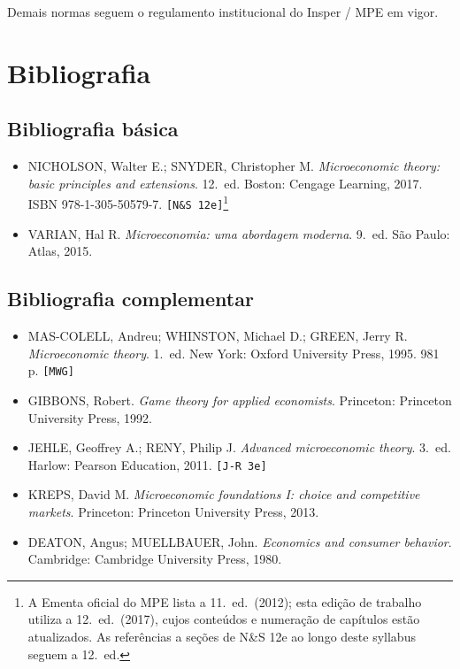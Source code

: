 \documentclass[11pt,a4paper]{article}
\newcommand{\ns}{N\&S 12e}
\newcommand{\jr}{J-R 3e}
\newcommand{\mwg}{MWG}
\begin{document}
Demais normas seguem o regulamento institucional do Insper / MPE em vigor.

\section{Bibliografia}
\label{sec:bibliografia}

\subsection*{Bibliografia básica}

\begin{itemize}
  \item NICHOLSON, Walter E.; SNYDER, Christopher M. \textit{Microeconomic theory: basic principles and extensions}. 12.~ed. Boston: Cengage Learning, 2017. ISBN 978-1-305-50579-7. \texttt{[\ns{}]}\footnote{A Ementa oficial do MPE lista a 11.~ed.\ (2012); esta edição de trabalho utiliza a 12.~ed.\ (2017), cujos conteúdos e numeração de capítulos estão atualizados. As referências a seções de \ns{} ao longo deste syllabus seguem a 12.~ed.}
  \item VARIAN, Hal R. \textit{Microeconomia: uma abordagem moderna}. 9.~ed. São Paulo: Atlas, 2015.
\end{itemize}

\subsection*{Bibliografia complementar}

\begin{itemize}
  \item MAS-COLELL, Andreu; WHINSTON, Michael D.; GREEN, Jerry R. \textit{Microeconomic theory}. 1.~ed. New York: Oxford University Press, 1995. 981 p. \texttt{[\mwg{}]}
  \item GIBBONS, Robert. \textit{Game theory for applied economists}. Princeton: Princeton University Press, 1992.
  \item JEHLE, Geoffrey A.; RENY, Philip J. \textit{Advanced microeconomic theory}. 3.~ed. Harlow: Pearson Education, 2011. \texttt{[\jr{}]}
  \item KREPS, David M. \textit{Microeconomic foundations I: choice and competitive markets}. Princeton: Princeton University Press, 2013.
  \item DEATON, Angus; MUELLBAUER, John. \textit{Economics and consumer behavior}. Cambridge: Cambridge University Press, 1980.
\end{itemize}
\end{document}
